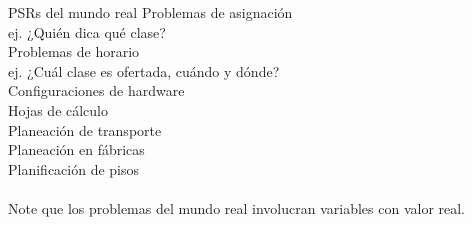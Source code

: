 \begin{frame}{PSRs del mundo real}
    Problemas de asignaci\'on\\
    \quad ej. ¿Qui\'en dica qu\'e clase?\\
    
    Problemas de horario\\
    \quad ej. ¿Cu\'al clase es ofertada, cu\'ando y d\'onde?\\
    
    Configuraciones de hardware\\
    
    Hojas de c\'alculo\\
    
    Planeaci\'on de transporte\\
    
    Planeaci\'on en f\'abricas\\
    
    Planificaci\'on de pisos\\~\\
    
    Note que los problemas del mundo real involucran variables con valor real.

\end{frame}
